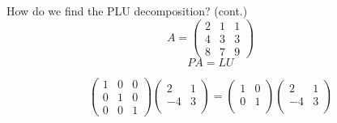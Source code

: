 \documentclass{beamer}
\begin{document}
\begin{frame}{How do we find the PLU decomposition? (cont.)}
    \[A=
        \begin{pmatrix}{}
            2 & 1 & 1 \\
            4 & 3 & 3 \\
            8 & 7 & 9
        \end{pmatrix}
    \]
    \[
        PA=LU
    \]

    \[
        \begin{pmatrix}{}
            1 & 0 & 0 \\
            0 & 1 & 0 \\
            0 & 0 & 1
            \end{pmatrix}\begin{pmatrix}{}
            2 & 1 \\
            -4 & 3 \\
        \end{pmatrix}
        =\begin{pmatrix}{}
            1 & 0 \\
            0 & 1 \\
        \end{pmatrix}
        \begin{pmatrix}{}
            2 & 1 \\
            -4 & 3 \\
        \end{pmatrix}
    \]


\end{frame}
\end{document}
